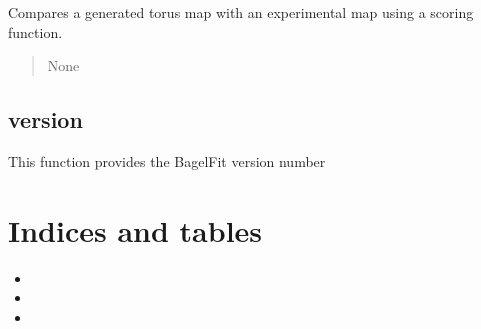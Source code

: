 \documentclass[letterpaper,10pt,english]{sphinxmanual}
\begin{document}

\begin{fulllineitems}
\label{\detokenize{examples:examples.examples.score_torus_map_with_experimental_map}}
\pysigstartsignatures
{}
\pysigstopsignatures
\sphinxAtStartPar
Compares a generated torus map with an experimental map using a scoring function.
\begin{quote}\begin{description}
\sphinxAtStartPar
None

\end{description}\end{quote}

\end{fulllineitems}



\section{version}
\label{\detokenize{modules:module-version}}\label{\detokenize{modules:version}}
\sphinxAtStartPar
This function provides the BagelFit version number


\chapter{Indices and tables}
\label{\detokenize{index:indices-and-tables}}\begin{itemize}
\item {} 
\sphinxAtStartPar
{}

\item {} 
\sphinxAtStartPar
{}

\item {} 
\sphinxAtStartPar
{}

\end{itemize}
\end{document}
